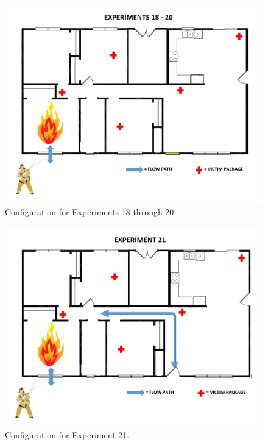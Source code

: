 \documentclass[12pt,oneside]{book}
\begin{document}
\begin{figure}[H]
	\centering
	\includegraphics[width=5in]{Figures/General/Exps18through20.png}
	\caption{Configuration for Experiments 18 through 20.}
	\label{fig:ExpConfig18to20}
\end{figure}

\begin{figure}[H]
	\centering
	\includegraphics[width=5in]{Figures/General/Exp21.png}
	\caption{Configuration for Experiment 21.}
	\label{fig:ExpConfig21}
\end{figure}
\end{document}
